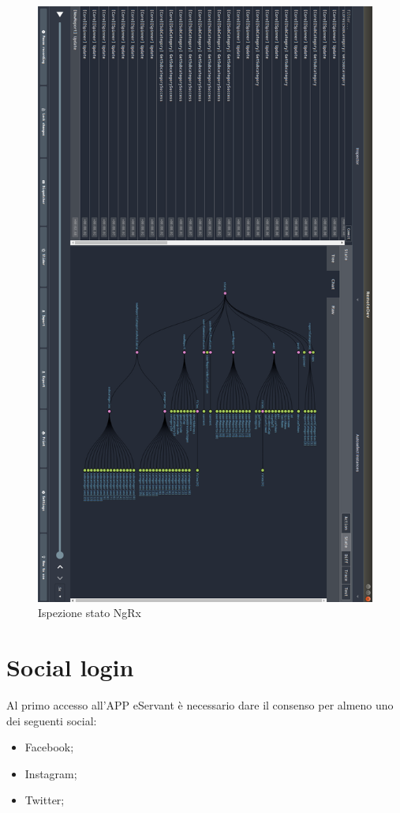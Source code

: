 \begin{figure}[h!]
    \centering  
    \caption{Ispezione stato NgRx}
    \includegraphics[scale=0.29]{img/cap2/ngrx-eservant-90}
\end{figure}

\section{Social login}
Al primo accesso all'APP eServant è necessario dare il consenso per almeno uno dei seguenti social:
\begin{itemize}
\item Facebook;
\item Instagram;
\item Twitter;
\end{itemize}

